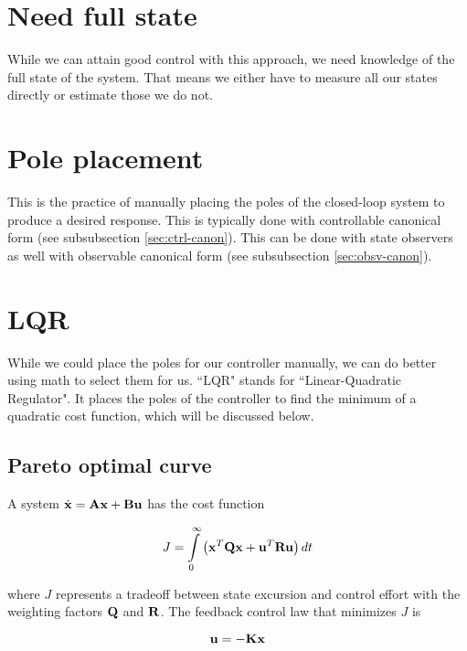 \section{Need full state}

While we can attain good control with this approach, we need knowledge of the
full state of the system. That means we either have to measure all our states
directly or estimate those we do not.

\section{Pole placement}

This is the practice of manually placing the poles of the closed-loop system to
produce a desired response. This is typically done with controllable canonical
form (see subsubsection \ref{sec:ctrl-canon}). This can be done with state
observers as well with observable canonical form (see subsubsection
\ref{sec:obsv-canon}).

\section{LQR}

While we could place the poles for our controller manually, we can do better
using math to select them for us. ``LQR" stands for ``Linear-Quadratic
Regulator". It places the poles of the controller to find the minimum of a
quadratic cost function, which will be discussed below.

\subsection{Pareto optimal curve}

A system $\dot{\mathbf{x}} = \mathbf{A}\mathbf{x} + \mathbf{B}\mathbf{u}$ has the cost function

\begin{equation*}
  J = \int\limits_0^\infty \left(\mathbf{x}^T\mathbf{Q}\mathbf{x} +
    \mathbf{u}^T\mathbf{R}\mathbf{u}\right) dt
\end{equation*}

where $J$ represents a tradeoff between \gls{state} excursion and control effort
with the weighting factors $\mathbf{Q}$ and $\mathbf{R}$. The feedback \gls{control
law} that minimizes $J$ is

\begin{equation*}
  \mathbf{u} = -\mathbf{K}\mathbf{x}
\end{equation*}

